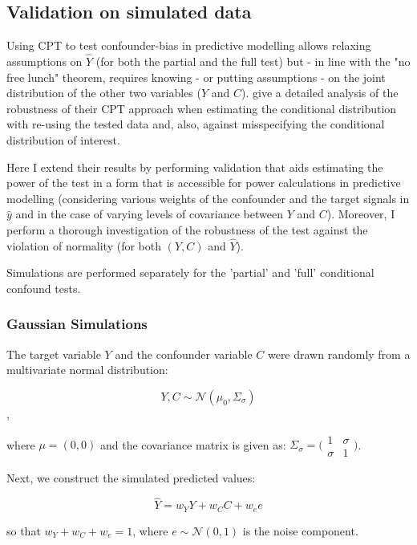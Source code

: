 \documentclass{article}
\begin{document}
\subsection{Validation on simulated data}

Using CPT to test confounder-bias in predictive modelling allows relaxing assumptions on $\hat{Y}$ (for both the partial and the full test) but - in line with the "no free lunch" theorem, requires knowing - or putting assumptions - on the joint distribution of the other two variables ($Y$ and $C$). 
\cite{berrett2020conditional} give a detailed analysis of the robustness of their CPT approach when estimating the conditional distribution with re-using the tested data and, also, against misspecifying the conditional distribution of interest.

Here I extend their results by performing validation that aids estimating the power of the test in a form that is accessible for power calculations in predictive modelling (considering various weights of the confounder and the target signals in $\hat{y}$ and in the case of varying levels of covariance between $Y$ and $C$).
Moreover, I perform a thorough investigation of the robustness of the test against the violation of normality (for both $(Y, C)$ and $\hat{Y}$).

Simulations are performed separately for the 'partial' and 'full' conditional confound tests.

\subsubsection*{Gaussian Simulations}
The target variable $Y$ and the confounder variable $C$ were drawn randomly from a multivariate normal distribution:

$$ Y, C \sim \mathcal{N}(\mu_0, \Sigma_\sigma) $$,

where $\mu=(0, 0)$ and the covariance matrix is given as:
$\Sigma_\sigma = \big(\begin{smallmatrix}
  1 & \sigma\\
  \sigma & 1
\end{smallmatrix}\big)$.

Next, we construct the simulated predicted values:

$$ \hat{Y} = w_Y Y + w_C C + w_e e$$

so that $w_Y + w_C + w_e = 1$, where $e \sim \mathcal{N}(0,1)$ is the noise component.
\end{document}
